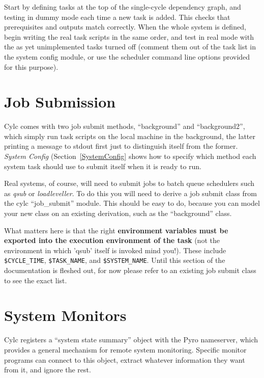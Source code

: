 \documentclass[11pt,a4paper]{article}
\begin{document}
Start by defining tasks at the top of the single-cycle dependency graph,
and testing in dummy mode each time a new task is added. This checks
that prerequisites and outputs match correctly. When the whole system is
defined, begin writing the real task scripts in the same order, and test
in real mode with the as yet unimplemented tasks turned off (comment
them out of the task list in the system config module, or use the
scheduler command line options provided for this purpose). 



\section{Job Submission}
\label{JobSubmission}

Cylc comes with two job submit methods, ``background'' and
``background2'', which simply run task scripts on the local machine in
the background, the latter printing a message to stdout first just to
distinguish itself from the former.  {\em System Config}
(Section~\ref{SystemConfig} shows how to specify which method each
system task should use to submit itself when it is ready to run.

Real systems, of course, will need to submit jobs to batch queue schedulers 
such as {\em qsub} or {\em loadleveller}. To do this you will need to
derive a job submit class from the cylc ``job\_submit'' module. This should
be easy to do, because you can model your new class on an existing
derivation, such as the ``background'' class.

What matters here is that the right {\bf environment variables must be
exported into the execution environment of the task} (not the
environment in which 'qsub' itself is invoked mind you!). These 
include \lstinline=$CYCLE_TIME=, \lstinline=$TASK_NAME=, and
\lstinline=$SYSTEM_NAME=.  Until this section of the documentation is
fleshed out, for now please refer to an existing job submit class to see
the exact list.


\section{System Monitors}
\label{System Monitors}

Cylc registers a ``system state summary'' object with the Pyro
nameserver, which provides a general mechanism for remote system
monitoring. Specific monitor programs can connect to this object, 
extract whatever information they want from it, and ignore the rest. 
\end{document}
